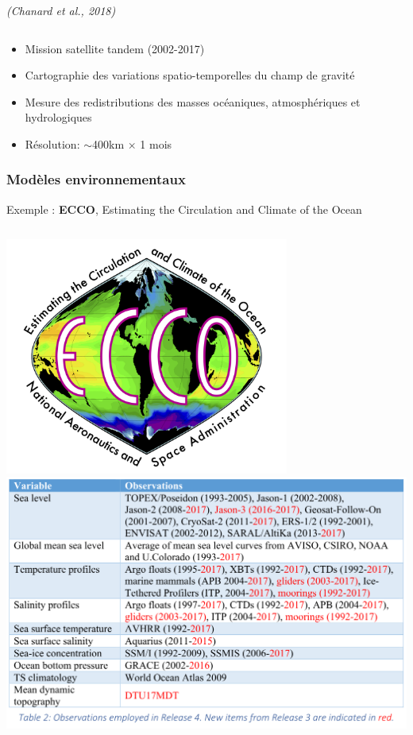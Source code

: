\documentclass[9pt]{beamer}
\begin{document}
\begin{frame}
\begin{columns}
\begin{column}{0.8\textwidth}
          \tiny{\textit{(Chanard et al., 2018)}}
        \end{column}
    \end{columns}
          \begin{itemize}
              \item Mission satellite tandem (2002-2017)
              \item Cartographie des variations spatio-temporelles du champ de gravité
              \item Mesure des redistributions des masses océaniques, atmosphériques et hydrologiques
              \item Résolution: $\sim$400km $\times$ 1 mois
          \end{itemize}
\end{frame}


\begin{frame}
\frametitle{Modèles environnementaux}
\centering
Exemple : \textbf{ECCO}, Estimating the Circulation and Climate of the Ocean\\
    \begin{columns}
        \begin{column}{0.5\textwidth}
            \includegraphics[width=0.7\textwidth]{figures/ecco.png}
            \includegraphics[width=\textwidth]{figures/obs_ecco.png}

\end{column}
\end{columns}
\end{frame}
\end{document}
